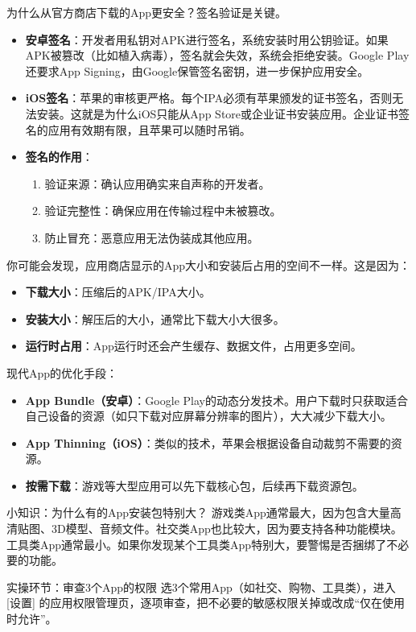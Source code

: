 
为什么从官方商店下载的App更安全？签名验证是关键。

\begin{itemize}
  \item \textbf{安卓签名}：开发者用私钥对APK进行签名，系统安装时用公钥验证。如果APK被篡改（比如植入病毒），签名就会失效，系统会拒绝安装。Google Play还要求App Signing，由Google保管签名密钥，进一步保护应用安全。
  \item \textbf{iOS签名}：苹果的审核更严格。每个IPA必须有苹果颁发的证书签名，否则无法安装。这就是为什么iOS只能从App Store或企业证书安装应用。企业证书签名的应用有效期有限，且苹果可以随时吊销。
  \item \textbf{签名的作用}：
  \begin{enumerate}
    \item 验证来源：确认应用确实来自声称的开发者。
    \item 验证完整性：确保应用在传输过程中未被篡改。
    \item 防止冒充：恶意应用无法伪装成其他应用。
  \end{enumerate}
\end{itemize}


你可能会发现，应用商店显示的App大小和安装后占用的空间不一样。这是因为：

\begin{itemize}
  \item \textbf{下载大小}：压缩后的APK/IPA大小。
  \item \textbf{安装大小}：解压后的大小，通常比下载大小大很多。
  \item \textbf{运行时占用}：App运行时还会产生缓存、数据文件，占用更多空间。
\end{itemize}

现代App的优化手段：

\begin{itemize}
  \item \textbf{App Bundle（安卓）}：Google Play的动态分发技术。用户下载时只获取适合自己设备的资源（如只下载对应屏幕分辨率的图片），大大减少下载大小。
  \item \textbf{App Thinning（iOS）}：类似的技术，苹果会根据设备自动裁剪不需要的资源。
  \item \textbf{按需下载}：游戏等大型应用可以先下载核心包，后续再下载资源包。
\end{itemize}

\begin{tcbinfo}{小知识：为什么有的App安装包特别大？}
游戏类App通常最大，因为包含大量高清贴图、3D模型、音频文件。社交类App也比较大，因为要支持各种功能模块。工具类App通常最小。如果你发现某个工具类App特别大，要警惕是否捆绑了不必要的功能。

\end{tcbinfo}

\begin{tcbpractice}{实操环节：审查3个App的权限}
选3个常用App（如社交、购物、工具类），进入 [设置] 的应用权限管理页，逐项审查，把不必要的敏感权限关掉或改成“仅在使用时允许”。

\end{tcbpractice}
